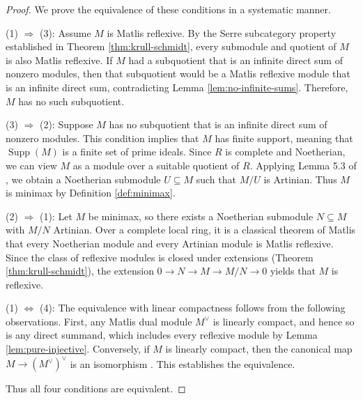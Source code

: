 \documentclass{kms-c}
\theoremstyle{plain}
\theoremstyle{definition}
\theoremstyle{remark}
\begin{document}
\begin{proof}
We prove the equivalence of these conditions in a systematic manner.

{(1) \(\Rightarrow\) (3):} Assume \( M \) is Matlis reflexive. By the Serre subcategory property established in Theorem \ref{thm:krull-schmidt}, every submodule and quotient of \( M \) is also Matlis reflexive. If \( M \) had a subquotient that is an infinite direct sum of nonzero modules, then that subquotient would be a Matlis reflexive module that is an infinite direct sum, contradicting Lemma \ref{lem:no-infinite-sums}. Therefore, \( M \) has no such subquotient.

{(3) \(\Rightarrow\) (2):} Suppose \( M \) has no subquotient that is an infinite direct sum of nonzero modules. This condition implies that \( M \) has finite support, meaning that \( \operatorname{Supp}(M) \) is a finite set of prime ideals. Since \( R \) is complete and Noetherian, we can view \( M \) as a module over a suitable quotient of \( R \). Applying Lemma 5.3 of \cite{Krause2025}, we obtain a Noetherian submodule \( U \subseteq M \) such that \( M/U \) is Artinian. Thus \( M \) is minimax by Definition \ref{def:minimax}.

{(2) \(\Rightarrow\) (1):} Let \( M \) be minimax, so there exists a Noetherian submodule \( N \subseteq M \) with \( M/N \) Artinian. Over a complete local ring, it is a classical theorem of Matlis \cite{Matlis1958} that every Noetherian module and every Artinian module is Matlis reflexive. Since the class of reflexive modules is closed under extensions (Theorem \ref{thm:krull-schmidt}), the extension \( 0 \to N \to M \to M/N \to 0 \) yields that \( M \) is reflexive.

{(1) \(\Leftrightarrow\) (4):} The equivalence with linear compactness follows from the following observations. First, any Matlis dual module \( M^\vee \) is linearly compact, and hence so is any direct summand, which includes every reflexive module by Lemma \ref{lem:pure-injective}. Conversely, if \( M \) is linearly compact, then the canonical map \( M \to (M^\vee)^\vee \) is an isomorphism \cite[Proposition 6.1]{Krause2025}. This establishes the equivalence.

Thus all four conditions are equivalent. 
\end{proof}
\end{document}
